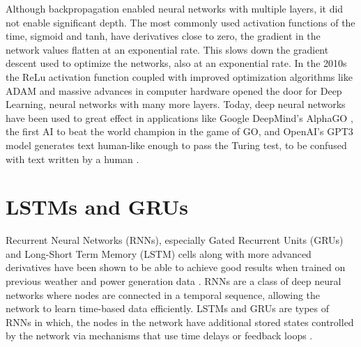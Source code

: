 Although backpropagation enabled neural networks with multiple layers, it did not enable significant depth. The most commonly used activation functions of the time, sigmoid and tanh, have derivatives close to zero, the gradient in the network values flatten at an exponential rate. This slows down the gradient descent used to optimize the networks, also at an exponential rate. In the 2010s the ReLu activation function \cite{nair_rectified_2010} coupled with improved optimization algorithms like ADAM and massive advances in computer hardware opened the door for Deep Learning, neural networks with many more layers. Today, deep neural networks have been used to great effect in applications like Google DeepMind's AlphaGO \cite{silver_mastering_2016}, the first AI to beat the world champion in the game of GO, and OpenAI's GPT3 model generates text human-like enough to pass the Turing test, to be confused with text written by a human \cite{vandeput_brief_nodate}.


\section{LSTMs and GRUs\label{cha:RNN}}
Recurrent Neural Networks (RNNs), especially Gated Recurrent Units (GRUs) and Long-Short Term Memory (LSTM) cells \cite{Goodfellow-et-al-2016} along with more advanced derivatives have been shown to be able to achieve good results when trained on previous weather and power generation data \cite{lin_temporal_2020, lee_forecasting_2018, jaidee_very_2019, su_machine_2019}.
RNNs are a class of deep neural networks where nodes are connected in a temporal sequence, allowing the network to learn time-based data efficiently\cite{lim_time_2021}. LSTMs and GRUs are types of RNNs in which, the nodes in the network have additional stored states controlled by the network via mechanisms that use time delays or feedback loops \cite{Goodfellow-et-al-2016, noauthor_recurrent_2021}.\\





